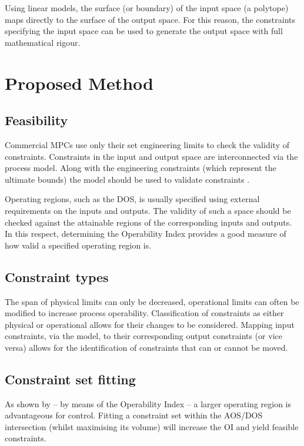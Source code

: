 \documentclass[final,authoryear,5pt,times,twocolumn]{elsarticle}
\begin{document}
Using linear models, the surface (or boundary) of the input space (a polytope) maps directly to the surface of the output space.
For this reason, the constraints specifying the input space can be used to generate the output space with full mathematical rigour.



\section{Proposed Method}\label{sec:method}

\subsection{Feasibility}\label{sec:feasibility}
Commercial MPCs use only their set engineering limits to check the validity of constraints.
Constraints in the input and output space are interconnected via the process model.
Along with the engineering constraints (which represent the ultimate bounds) the model should be used to validate constraints \citep{vinsonphd}. 

Operating regions, such as the DOS, is usually specified using external requirements on the inputs and outputs.
The validity of such a space should be checked against the attainable regions of the corresponding inputs and outputs.
In this respect, determining the Operability Index provides a good measure of how valid a specified operating region is.

\subsection{Constraint types}\label{sec:contypes}
The span of physical limits can only be decreased, operational limits can often be modified to increase process operability.
Classification of constraints as either physical or operational allows for their changes to be considered.
Mapping input constraints, via the model, to their corresponding output constraints (or vice versa) allows for the identification of constraints that can or cannot be moved.

\subsection{Constraint set fitting}\label{sec:setfit}
As shown by \citet{vinsonartoi} -- by means of the Operability Index -- a larger operating region is advantageous for control.
Fitting a constraint set within the AOS/DOS intersection (whilst maximising its volume) will increase the OI and yield feasible constraints.
\end{document}
